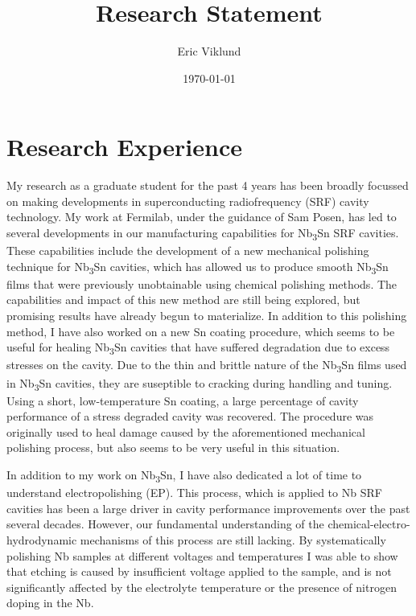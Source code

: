 \documentclass[]{revtex4-2}
\begin{document}
\title{Research Statement}
\author{Eric Viklund}


\date{\today}

\begin{abstract}



\end{abstract}

\maketitle

\section{Research Experience}

    My research as a graduate student for the past 4 years has been broadly focussed on making  developments in superconducting radiofrequency (SRF) cavity technology. My work at Fermilab, under the guidance of Sam Posen, has led to several developments in our manufacturing capabilities for Nb\textsubscript{3}Sn SRF cavities. These capabilities include the development of a new mechanical polishing technique for Nb\textsubscript{3}Sn cavities, which has allowed us to produce smooth Nb\textsubscript{3}Sn films that were previously unobtainable using chemical polishing methods.\cite{viklund2023improving} The capabilities and impact of this new method are still being explored, but promising results have already begun to materialize. In addition to this polishing method, I have also worked on a new Sn coating procedure, which seems to be useful for healing Nb\textsubscript{3}Sn cavities that have suffered degradation due to excess stresses on the cavity. Due to the thin and brittle nature of the Nb\textsubscript{3}Sn films used in Nb\textsubscript{3}Sn cavities, they are suseptible to cracking during handling and tuning. Using a short, low-temperature Sn coating, a large percentage of cavity performance of a stress degraded cavity was recovered. The procedure was originally used to heal damage caused by the aforementioned mechanical polishing process, but also seems to be very useful in this situation.

    In addition to my work on Nb\textsubscript{3}Sn, I have also dedicated a lot of time to understand electropolishing (EP). This process, which is applied to Nb SRF cavities has been a large driver in cavity performance improvements over the past several decades. However, our fundamental understanding of the chemical-electro-hydrodynamic mechanisms of this process are still lacking. By systematically polishing Nb samples at different voltages and temperatures I was able to show that etching is caused by insufficient voltage applied to the sample, and is not significantly affected by the electrolyte temperature or the presence of nitrogen doping in the Nb.\cite{viklund2022studies}
\end{document}
